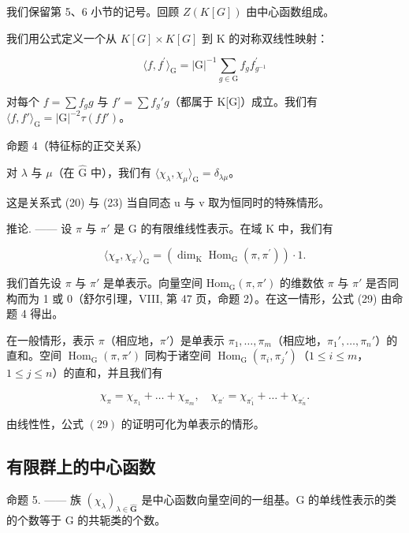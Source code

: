 我们保留第 5、6 小节的记号。回顾 \(Z(K[G])\) 由中心函数组成。

我们用公式定义一个从 \(K[G] \times K[G]\) 到 K 的对称双线性映射：

\[
\langle f, f ^ {\prime} \rangle_ {\mathrm{G}} = | \mathrm{G} | ^ {- 1} \sum_ {g \in \mathrm{G}} f _ {g} f _ {g ^ {- 1}} ^ {\prime}\tag{28}
\]

对每个 \(f = \sum f_{g}g\) 与 \(f' = \sum f_{g}'g\)（都属于 K{[}G{]}）成立。我们有 \(\langle f, f' \rangle_{\mathrm{G}} = |\mathrm{G}|^{-2}\tau (ff')\)。

命题 4（特征标的正交关系）

对 \(\lambda\) 与 \(\mu\)（在 \(\hat{\mathrm{G}}\) 中），我们有 \(\langle \chi_{\lambda},\chi_{\mu}\rangle_{\mathrm{G}} = \delta_{\lambda \mu}\)。

这是关系式 (20) 与 (23) 当自同态 u 与 v 取为恒同时的特殊情形。

推论. —— 设 \(\pi\) 与 \(\pi'\) 是 G 的有限维线性表示。在域 K 中，我们有

\[
\langle \chi_ {\pi}, \chi_ {\pi^ {\prime}} \rangle_ {\mathrm{G}} = (\dim_ {\mathrm{K}} \operatorname{Hom} _ {\mathrm{G}} (\pi , \pi^ {\prime})) \cdot 1.\tag{29}
\]

我们首先设 \(\pi\) 与 \(\pi'\) 是单表示。向量空间 \(\mathrm{Hom}_{\mathrm{G}}(\pi, \pi')\) 的维数依 \(\pi\) 与 \(\pi'\) 是否同构而为 1 或 0（舒尔引理，VIII, 第 47 页，命题 2）。在这一情形，公式 (29) 由命题 4 得出。

在一般情形，表示 \(\pi\)（相应地，\(\pi'\)）是单表示 \(\pi_{1},\ldots,\pi_{m}\)（相应地，\(\pi_{1}',\ldots,\pi_{n}'\)）的直和。空间 \(\operatorname{Hom}_{\mathrm{G}}(\pi,\pi')\) 同构于诸空间 \(\operatorname{Hom}_{\mathrm{G}}(\pi_{i},\pi_{j}')\)（\(1\leqslant i\leqslant m\)，\(1\leqslant j\leqslant n\)）的直和，并且我们有

\[
\chi_ {\pi} = \chi_ {\pi_ {1}} + \dots + \chi_ {\pi_ {m}}, \quad \chi_ {\pi^ {\prime}} = \chi_ {\pi_ {1} ^ {\prime}} + \dots + \chi_ {\pi_ {n} ^ {\prime}}.
\]

由线性性，公式 \((29)\) 的证明可化为单表示的情形。

\subsection{有限群上的中心函数}

命题 5. —— 族 \((\chi_{\lambda})_{\lambda\in\widehat{\mathbf{G}}}\) 是中心函数向量空间的一组基。G 的单线性表示的类的个数等于 G 的共轭类的个数。

